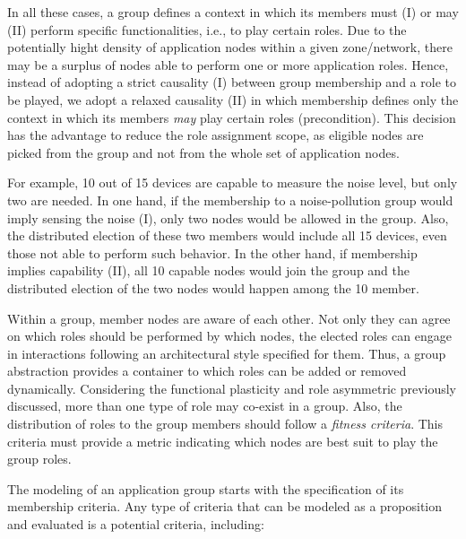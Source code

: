 In all these cases, a group defines a context in which its members must (I) or may (II) perform specific functionalities, i.e., to play certain roles. Due to the potentially hight density of application nodes within a given zone/network, there may be a surplus of nodes able to perform one or more application roles. Hence, instead of adopting a strict causality (I) between group membership and a role to be played, we adopt a relaxed causality (II) in which membership defines only the context in which its members \textit{may} play certain roles (precondition). This decision has the advantage to reduce the role assignment scope, as eligible nodes are picked from the group and not from the whole set of application nodes. 

For example, 10 out of 15 devices are capable to measure the noise level, but only two are needed. In one hand, if the membership to a noise-pollution group would imply sensing the noise (I), only two nodes would be allowed in the group. Also, the distributed election of these two members would include all 15 devices, even those not able to perform such behavior. In the other hand, if membership implies capability (II), all 10 capable nodes would join the group and the distributed election of the two nodes would happen among the 10 member.


Within a group, member nodes are aware of each other. Not only they can agree on which roles should be performed by which nodes, the elected roles can engage in interactions following an architectural style specified for them. Thus, a group abstraction provides a container to which roles can be added or removed dynamically. Considering the functional plasticity and role asymmetric previously discussed, more than one type of role may co-exist in a group. Also, the distribution of roles to the group members should follow a \textit{fitness criteria}. This criteria must provide a metric indicating which nodes are best suit to play the group roles.

The modeling of an application group starts with the specification of its membership criteria. Any type of criteria that can be modeled as a proposition and evaluated is a potential criteria, including:

